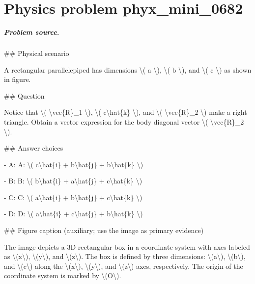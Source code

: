 
\chapter{Physics problem phyx\_mini\_0682}
\label{ch:PhyXMiniProblems_problem_phyx_mini_0682}

\paragraph{Problem source.}
\#\# Physical scenario

A rectangular parallelepiped has dimensions \textbackslash{}( a \textbackslash{}), \textbackslash{}( b \textbackslash{}), and \textbackslash{}( c \textbackslash{}) as shown in figure.

\#\# Question

Notice that \textbackslash{}( \textbackslash{}vec\{R\}\_1 \textbackslash{}), \textbackslash{}( c\textbackslash{}hat\{k\} \textbackslash{}), and \textbackslash{}( \textbackslash{}vec\{R\}\_2 \textbackslash{}) make a right triangle. Obtain a vector expression for the body diagonal vector \textbackslash{}( \textbackslash{}vec\{R\}\_2 \textbackslash{}).

\#\# Answer choices

- A: A: \textbackslash{}( c\textbackslash{}hat\{i\} + b\textbackslash{}hat\{j\} + b\textbackslash{}hat\{k\} \textbackslash{})

- B: B: \textbackslash{}( b\textbackslash{}hat\{i\} + a\textbackslash{}hat\{j\} + c\textbackslash{}hat\{k\} \textbackslash{})

- C: C: \textbackslash{}( a\textbackslash{}hat\{i\} + b\textbackslash{}hat\{j\} + c\textbackslash{}hat\{k\} \textbackslash{})

- D: D: \textbackslash{}( a\textbackslash{}hat\{i\} + c\textbackslash{}hat\{j\} + b\textbackslash{}hat\{k\} \textbackslash{})

\#\# Figure caption (auxiliary; use the image as primary evidence)

The image depicts a 3D rectangular box in a coordinate system with axes labeled as \textbackslash{}(x\textbackslash{}), \textbackslash{}(y\textbackslash{}), and \textbackslash{}(z\textbackslash{}). The box is defined by three dimensions: \textbackslash{}(a\textbackslash{}), \textbackslash{}(b\textbackslash{}), and \textbackslash{}(c\textbackslash{}) along the \textbackslash{}(x\textbackslash{}), \textbackslash{}(y\textbackslash{}), and \textbackslash{}(z\textbackslash{}) axes, respectively. The origin of the coordinate system is marked by \textbackslash{}(O\textbackslash{}). 

